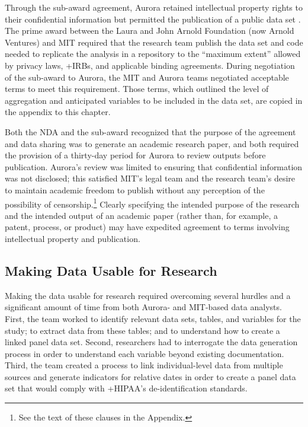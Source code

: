 \documentclass[
]{WileySix}
\begin{document}
Through the sub-award agreement, Aurora retained intellectual property rights to their confidential information but permitted the publication of a public data set \citep[see][]{doyle2018}. The prime award between the Laura and John Arnold Foundation (now Arnold Ventures) and MIT required that the research team publish the data set and code needed to replicate the analysis in a repository to the ``maximum extent'' allowed by privacy laws, +IRB\textbar s, and applicable binding agreements. During negotiation of the sub-award to Aurora, the MIT and Aurora teams negotiated acceptable terms to meet this requirement. Those terms, which outlined the level of aggregation and anticipated variables to be included in the data set, are copied in the appendix to this chapter.

Both the NDA and the sub-award recognized that the purpose of the agreement and data sharing was to generate an academic research paper, and both required the provision of a thirty-day period for Aurora to review outputs before publication. Aurora's review was limited to ensuring that confidential information was not disclosed; this satisfied MIT's legal team and the research team's desire to maintain academic freedom to publish without any perception of the possibility of censorship.\footnote{See the text of these clauses in the Appendix.} Clearly specifying the intended purpose of the research and the intended output of an academic paper (rather than, for example, a patent, process, or product) may have expedited agreement to terms involving intellectual property and publication.

\hypertarget{making-data-usable-for-research-3}{%
\subsection{Making Data Usable for Research}\label{making-data-usable-for-research-3}}

Making the data usable for research required overcoming several hurdles and a significant amount of time from both Aurora- and MIT-based data analysts. First, the team worked to identify relevant data sets, tables, and variables for the study; to extract data from these tables; and to understand how to create a linked panel data set. Second, researchers had to interrogate the data generation process in order to understand each variable beyond existing documentation. Third, the team created a process to link individual-level data from multiple sources and generate indicators for relative dates in order to create a panel data set that would comply with +HIPAA\textbar's de-identification standards.
\end{document}
